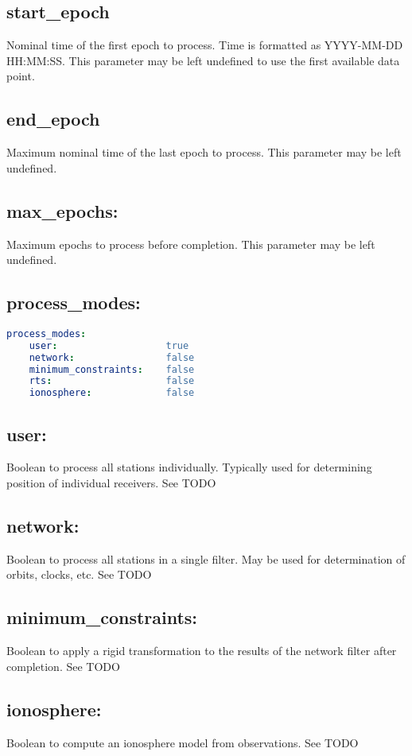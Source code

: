 \subsection{start\_epoch}
Nominal time of the first epoch to process. Time is formatted as YYYY-MM-DD HH:MM:SS.
This parameter may be left undefined to use the first available data point.

\subsection{end\_epoch}
Maximum nominal time of the last epoch to process. This parameter may be left undefined.

\subsection{max\_epochs:}
Maximum epochs to process before completion. This parameter may be left undefined.

\subsection{process\_modes:}

\begin{lstlisting}[language=yaml,caption=process\_modes:]
process_modes:
    user:                   true
    network:                false
    minimum_constraints:    false
    rts:                    false
    ionosphere:             false
\end{lstlisting}

\subsection{user:}
Boolean to process all stations individually. Typically used for determining position of individual receivers. See TODO
\subsection{network:}
Boolean to process all stations in a single filter. May be used for determination of orbits, clocks, etc. See TODO
\subsection{minimum\_constraints:}
Boolean to apply a rigid transformation to the results of the network filter after completion. See TODO
\subsection{ionosphere:}
Boolean to compute an ionosphere model from observations. See TODO
